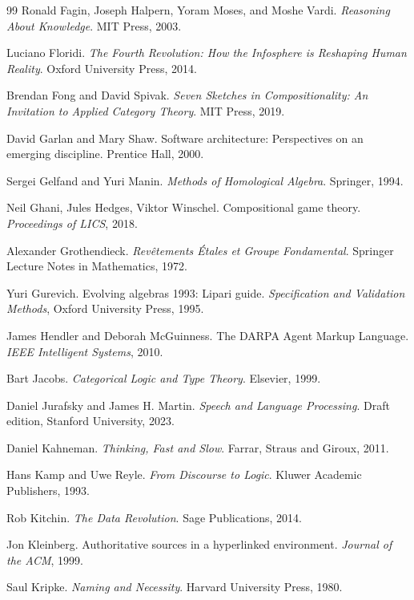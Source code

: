 \documentclass[12pt,a4paper]{article}
\begin{document}
\begin{thebibliography}{99}
Ronald Fagin, Joseph Halpern, Yoram Moses, and Moshe Vardi.
\textit{Reasoning About Knowledge}.
MIT Press, 2003.

Luciano Floridi.
\textit{The Fourth Revolution: How the Infosphere is Reshaping Human Reality}.
Oxford University Press, 2014.

Brendan Fong and David Spivak.
\textit{Seven Sketches in Compositionality: An Invitation to Applied Category Theory}.
MIT Press, 2019.

David Garlan and Mary Shaw.
Software architecture: Perspectives on an emerging discipline.
Prentice Hall, 2000.

Sergei Gelfand and Yuri Manin.
\textit{Methods of Homological Algebra}.
Springer, 1994.

Neil Ghani, Jules Hedges, Viktor Winschel.
Compositional game theory.
\textit{Proceedings of LICS}, 2018.

Alexander Grothendieck.
\textit{Revêtements Étales et Groupe Fondamental}.
Springer Lecture Notes in Mathematics, 1972.

Yuri Gurevich.
Evolving algebras 1993: Lipari guide.
\textit{Specification and Validation Methods}, Oxford University Press, 1995.

James Hendler and Deborah McGuinness.
The DARPA Agent Markup Language.
\textit{IEEE Intelligent Systems}, 2010.

Bart Jacobs.
\textit{Categorical Logic and Type Theory}.
Elsevier, 1999.

Daniel Jurafsky and James H. Martin.
\textit{Speech and Language Processing}.
Draft edition, Stanford University, 2023.

Daniel Kahneman.
\textit{Thinking, Fast and Slow}.
Farrar, Straus and Giroux, 2011.

Hans Kamp and Uwe Reyle.
\textit{From Discourse to Logic}.
Kluwer Academic Publishers, 1993.

Rob Kitchin.
\textit{The Data Revolution}.
Sage Publications, 2014.

Jon Kleinberg.
Authoritative sources in a hyperlinked environment.
\textit{Journal of the ACM}, 1999.

Saul Kripke.
\textit{Naming and Necessity}.
Harvard University Press, 1980.


\end{thebibliography}
\end{document}
